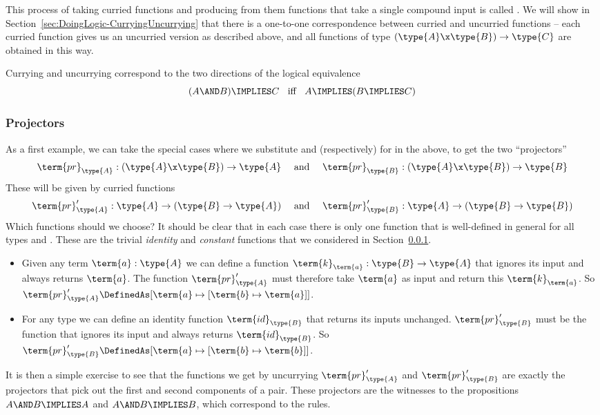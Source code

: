 This process of taking curried functions and producing from them functions that take a single compound input is called .  We will show in  
Section~\ref{sec:DoingLogic-CurryingUncurrying}
that there is a one-to-one correspondence between curried and uncurried functions -- each curried function gives us an uncurried version as described above, and all functions of type 
$(\type{A} \x \type{B}) \to \type{C}$ are obtained in this way.

Currying and uncurrying correspond to the two directions of the logical equivalence 
\[
(A \AND B) \IMPLIES C
\;\;\mbox{ iff }\;\; 
A \IMPLIES (B \IMPLIES C)
\]

\subsubsection{Projectors}

As a first example, we can take the special cases where we substitute  and  (respectively) for  in the above, to get the two ``projectors''
\[
\term{pr}_\type{A}:(\type{A} \x \type{B}) \to \type{A}
\quad \mbox{ and } \quad
\term{pr}_\type{B}:(\type{A} \x \type{B}) \to \type{B}
\]
These will be given by curried functions
\[
\term{pr}^{\prime}_\type{A}:\type{A} \to (\type{B} \to \type{A})
\quad \mbox{ and } \quad
\term{pr}^{\prime}_\type{B}:\type{A} \to (\type{B} \to \type{B})
\] 
%
Which functions should we choose?  It should be clear that in each case there is only one function that is well-defined in general for all types  and .  These are the trivial \emph{identity} and \emph{constant} functions that we considered in Section~\ref{}.

\begin{itemize}
%
\item Given any term $\term{a}:\type{A}$ we can define a function $\term{k}_\term{a}:\type{B} \to \type{A}$ that ignores its input and always returns $\term{a}$. 
The function $\term{pr}^{\prime}_\type{A}$ must therefore take $\term{a}$ as input and return this $\term{k}_\term{a}$.  So
$\term{pr}^{\prime}_\type{A} 
\DefinedAs
[\term{a} \mapsto [\term{b} \mapsto \term{a}]]$.
%
\item For any type  we can define an identity function $\term{id}_{\type{B}}$ that returns its inputs unchanged. 
$\term{pr}^{\prime}_\type{B}$ must be the function that ignores its input and always returns $\term{id}_{\type{B}}$.  So
$\term{pr}^{\prime}_\type{B} 
\DefinedAs
[\term{a} \mapsto [\term{b} \mapsto \term{b}]]$.
%
\end{itemize}
%
It is then a simple exercise to see that the functions we get by uncurrying 
$\term{pr}^{\prime}_\type{A}$ and $\term{pr}^{\prime}_\type{B}$ are exactly the projectors that pick out the first and second components of a pair.  These projectors are the witnesses to the propositions $A \AND B \IMPLIES A$ and $A \AND B \IMPLIES B$, which correspond to the  rules.








